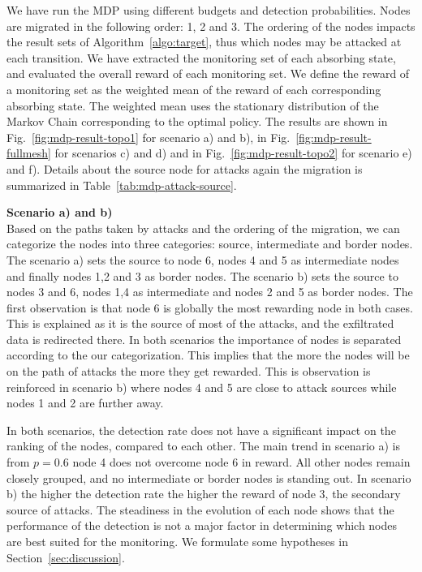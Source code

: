 

We have run the MDP using different budgets and detection probabilities.
Nodes are migrated in the following order: 1, 2 and 3.
The ordering of the nodes impacts the result sets of Algorithm~\ref{algo:target}, thus which nodes may be attacked at each transition.
We have extracted the monitoring set of each absorbing state, and evaluated the overall reward of each monitoring set.
We define the reward of a monitoring set as the weighted mean of the reward of each corresponding absorbing state.
The weighted mean uses the stationary distribution of the Markov Chain corresponding to the optimal policy.
The results are shown in Fig.~\ref{fig:mdp-result-topo1} for scenario a) and b), in Fig.~\ref{fig:mdp-result-fullmesh} for scenarios c) and d) and in Fig.~\ref{fig:mdp-result-topo2} for scenario e) and f).
Details about the source node for attacks again the migration is summarized in Table~\ref{tab:mdp-attack-source}.



\textbf{Scenario a) and b)\\}
Based on the paths taken by attacks and the ordering of the migration, we can categorize the nodes into three categories: source, intermediate and border nodes.
The scenario a) sets the source to node 6, nodes 4 and 5 as intermediate nodes and finally nodes 1,2 and 3 as border nodes.
The scenario b) sets the source to nodes 3 and 6, nodes 1,4 as intermediate and nodes 2 and 5 as border nodes.
The first observation is that node 6 is globally the most rewarding node in both cases.
This is explained as it is the source of most of the attacks, and the exfiltrated data is redirected there.
In both scenarios the importance of nodes is separated according to the our categorization. 
This implies that the more the nodes will be on the path of attacks the more they get rewarded.
This is observation is reinforced in scenario b) where nodes 4 and 5 are close to attack sources while nodes 1 and 2 are further away.

In both scenarios, the detection rate does not have a significant impact on the ranking of the nodes, compared to each other.
The main trend in scenario a) is from $p=0.6$  node 4 does not overcome node 6 in reward. All other nodes remain closely grouped, and no intermediate or border nodes is standing out.
In scenario b) the higher the detection rate the higher the reward of node 3, the secondary source of attacks.
The steadiness in the evolution of each node shows that the performance of the detection is not a major factor in determining which nodes are best suited for the monitoring. We formulate some hypotheses in Section~\ref{sec:discussion}.

